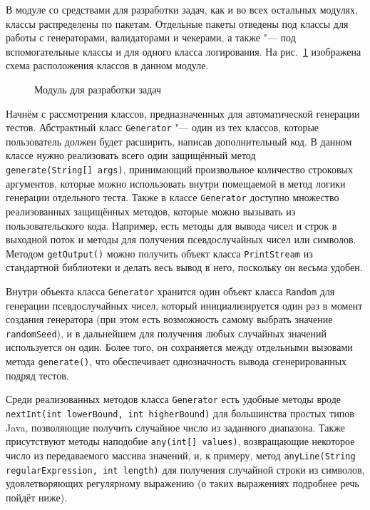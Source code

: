 В модуле со средствами для разработки задач, как и во всех остальных модулях, классы распределены по пакетам. Отдельные пакеты отведены под классы для работы с генераторами, валидаторами и чекерами, а также "--- под вспомогательные классы и для одного класса логирования. На рис.~\ref{package_diagram_development} изображена схема расположения классов в данном модуле.

\begin{figure}[h]
\caption{Модуль для разработки задач}
\label{package_diagram_development}
\end{figure}

Начнём с рассмотрения классов, предназначенных для автоматической генерации тестов. Абстрактный класс \texttt{Generator} "--- один из тех классов, которые пользователь должен будет расширить, написав дополнительный код. В данном классе нужно реализовать всего один защищённый метод \texttt{generate(String[]~args)}, принимающий произвольное количество строковых аргументов, которые можно использовать внутри помещаемой в метод логики генерации отдельного теста. Также в классе \texttt{Generator} доступно множество реализованных защищённых методов, которые можно вызывать из пользовательского кода. Например, есть методы для вывода чисел и строк в выходной поток и методы для получения псевдослучайных чисел или символов. Методом \texttt{getOutput()} можно получить объект класса \texttt{PrintStream} из стандартной библиотеки и делать весь вывод в него, поскольку он весьма удобен.

Внутри объекта класса \texttt{Generator} хранится один объект класса \texttt{Random} для генерации псевдослучайных чисел, который инициализируется один раз в момент создания генератора (при этом есть возможность самому выбрать значение \texttt{random\-Seed}), и в дальнейшем для получения любых случайных значений используется он один. Более того, он сохраняется между отдельными вызовами метода \texttt{generate()}, что обеспечивает однозначность вывода сгенерированных подряд тестов.

Среди реализованных методов класса \texttt{Generator} есть удобные методы вроде \texttt{nextInt(int~lowerBound, int~higherBound)} для большинства простых типов Java, позволяющие получить случайное число из заданного диапазона. Также присутствуют методы наподобие \texttt{any(int[]~values)}, возвращающие некоторое число из передаваемого массива значений, и, к примеру, метод \texttt{anyLine(String regular\-Expression, int~length)} для получения случайной строки из символов, удовлетворяющих регулярному выражению (о таких выражениях подробнее речь пойдёт ниже).


